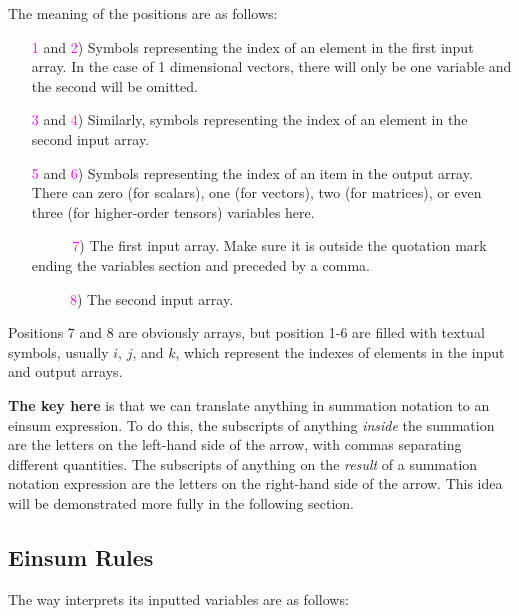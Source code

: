 The meaning of the positions are as follows:

\begin{enumerate}
\item[\textcolor{magenta}{1} and \textcolor{magenta}{2})] Symbols representing the index of an element in the first input array. In the case of 1 dimensional vectors, there will only be one variable and the second will be omitted.
\item[\textcolor{magenta}{3} and \textcolor{magenta}{4})] Similarly, symbols representing the index of an element in the second input array.
\item[\textcolor{magenta}{5} and \textcolor{magenta}{6})] Symbols representing the index of an item in the output array. There can zero (for scalars), one (for vectors), two (for matrices), or even three (for higher-order tensors) variables here.
\item[\textcolor{white}{easter} \textcolor{magenta}{7})] The first input array. Make sure it is outside the quotation mark ending the variables section and preceded by a comma.
\item[\textcolor{white}{e g g!} \textcolor{magenta}{8})] The second input array.
\end{enumerate}

Positions 7 and 8 are obviously arrays, but position 1-6 are filled with textual symbols, usually $i$, $j$, and $k$, which represent the indexes of elements in the input and output arrays.

\textbf{The key here} is that we can translate anything in summation notation to an einsum expression.
To do this, the subscripts of anything \emph{inside} the summation are the letters on the left-hand side of the arrow, with commas separating different quantities.
The subscripts of anything on the \emph{result} of a summation notation expression are the letters on the right-hand side of the arrow.
This idea will be demonstrated more fully in the following section.

\subsection*{Einsum Rules}

The way  interprets its inputted variables are as follows:

